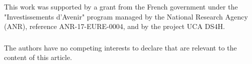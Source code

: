 \documentclass[runningheads]{llncs}
\newif\iflong\longfalse
\begin{document}
\begin{credits}
\subsubsection{\ackname} 
This work was supported by a grant from the French government under
the "Investissements d’Avenir" program managed by the National
Research Agency (ANR), reference ANR-17-EURE-0004, and by
the project UCA DS4H.

\subsubsection{\discintname}
The authors have no competing interests to declare that are relevant to the content of this article.
\end{credits}





\iflong
    \appendix
    \section{Additional Consistency Models}\label{app:more-consistency-models}
    
    \section{Omitted Proofs}\label{app:proofs}
    
\fi
\end{document}
